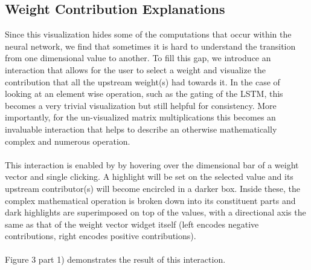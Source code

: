 \documentclass[journal]{vgtc}                %
\begin{document}
\subsection{Weight Contribution Explanations}
Since this visualization hides some of the computations that occur within the neural network, we find that sometimes it is hard to understand the transition from one dimensional value to another.
To fill this gap, we introduce an interaction that allows for the user to select a weight and visualize the contribution that all the upstream weight(s) had towards it.
In the case of looking at an element wise operation, such as the gating of the LSTM, this becomes a very trivial visualization but still helpful for consistency.
More importantly, for the un-visualized matrix multiplications this becomes an invaluable interaction that helps to describe an otherwise mathematically complex and numerous operation.
\\
\\
This interaction is enabled by by hovering over the dimensional bar of a weight vector and single clicking.
A highlight will be set on the selected value and its upstream contributor(s) will become encircled in a darker box.
Inside these, the complex mathematical operation is broken down into its constituent parts and dark highlights are superimposed on top of the values, with a directional axis the same as that of the weight vector widget itself (left encodes negative contributions, right encodes positive contributions).
\\
\\
Figure 3 part 1) demonstrates the result of this interaction.
\end{document}
